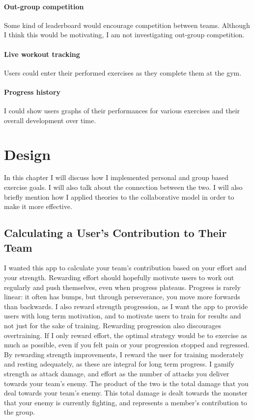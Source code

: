 \documentclass{l4proj}
\begin{document}
  \subsubsection{Out-group competition}
  Some kind of leaderboard would encourage competition between teams. Although I think this would be motivating, I am not investigating out-group competition.

  \subsubsection{Live workout tracking}
  Users could enter their performed exercises as they complete them at the gym.

  \subsubsection{Progress history}
  I could show users graphs of their performances for various exercises and their overall development over time.


\chapter{Design}
In this chapter I will discuss how I implemented personal and group based exercise goals. I will also talk about the connection between the two. I will also briefly mention how I applied theories to the collaborative model in order to make it more effective.

\section{Calculating a User's Contribution to Their Team}
I wanted this app to calculate your team's contribution based on your effort and your strength. Rewarding effort should hopefully motivate users to work out regularly and push themselves, even when progress plateaus. Progress is rarely linear: it often has bumps, but through perseverance, you move more forwards than backwards. I also reward strength progression, as I want the app to provide users with long term motivation, and to motivate users to train for results and not just for the sake of training. Rewarding progression also discourages overtraining. If I only reward effort, the optimal strategy would be to exercise as much as possible, even if you felt pain or your progression stopped and regressed. By rewarding strength improvements, I reward the user for training moderately and resting adequately, as these are integral for long term progress. I gamify strength as attack damage, and effort as the number of attacks you deliver towards your team's enemy. The product of the two is the total damage that you deal towards your team's enemy. This total damage is dealt towards the monster that your enemy is currently fighting, and represents a member's contribution to the group.
\end{document}
